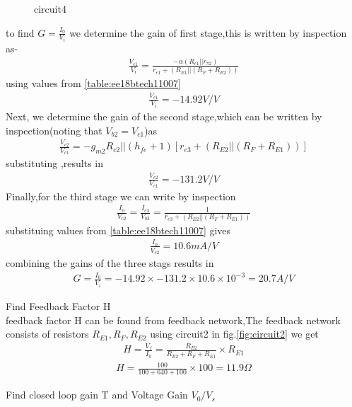 \begin{enumerate}[label=\thesubsection.\arabic*.,ref=\thesubsection.\theenumi]
{\begin{figure}[!ht]
\begin{center}
		\resizebox{\columnwidth}{!}{}
	\end{center}
\caption{circuit4}
\label{fig:circuit4}
\end{figure}
to find $G=\frac{I_0}{V_i}$ we determine the gain of first stage,this is written by inspection as-
\begin{align}
    \frac{V_{c1}}{V_i}=\frac{-\alpha(R_{c1}||r_{\pi2})}{r_{e1}+(R_{E1}||(R_F+R_{E2}))}
\end{align}
using values from \ref{table:ee18btech11007}
\begin{align}
\frac{V_{c1}}{V_i}=-14.92V/V     
\end{align}
Next, we determine the gain of the second stage,which can be written by inspection(noting that $V_{b2}=V_{c1}$)as
\begin{align}
    \frac{V_{c2}}{V_{c1}}=-g_{m2}{R_{c2}||(h_{fe}+1)[r_{e3}+(R_{E2}||(R_F+R_{E1}))]}
\end{align}
substituting ,results in 
\begin{align}
    \frac{V_{c2}}{V_{c1}}=-131.2 V/V
\end{align}
Finally,for the third stage we can write by inspection
\begin{align}
    \frac{I_0}{V_{c2}}=\frac{I_{e3}}{V_{b3}}=\frac{1}{r_{e3}+(R_{E2}||(R_F+R_{E1}))}
\end{align}
substituing values from \ref{table:ee18btech11007} gives
\begin{align}
    \frac{I_0}{V_{c2}}=10.6mA/V
\end{align}
combining the gains of the three stags results in
\begin{align}
G=\frac{I_0}{V_i}=-14.92\times-131.2\times10.6\times10^{-3}=20.7A/V    
\end{align}
\item Find Feedback Factor H
\\
\solution feedback factor H can be found from feedback network,The feedback network consists of resistors $R_{E1},R_F,R_{E2}$ using circuit2 in  fig.\ref{fig:circuit2} we get
\begin{align}
    H=\frac{V_f}{I_0}=\frac{R_{E2}}{R_{E2}+R_F+R_{E1}} \times R_{E1}
\end{align}
\begin{align}
   H =\frac{100}{100+640+100}\times 100=11.9\Omega
\end{align}
\item Find closed loop gain T and Voltage Gain $V_0/V_s$
\\ \solution
}
\end{enumerate}
